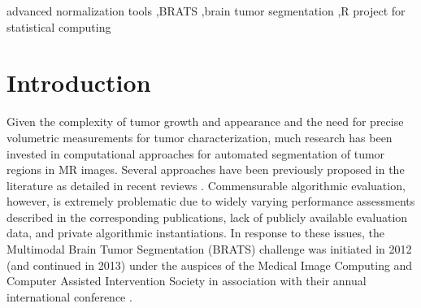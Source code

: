 \documentclass[preprint,authoryear,review,12pt]{elsarticle}
\begin{document}
\begin{frontmatter}
\begin{keyword}
advanced normalization tools \sep BRATS \sep brain tumor segmentation \sep R project for statistical computing
\end{keyword}

\end{frontmatter}

%
%
\newpage







%
%
%


%
%

\section{Introduction}
Given the complexity of tumor growth and appearance and the need
for precise volumetric measurements for tumor characterization, 
much research has been invested in computational approaches for 
automated segmentation of tumor regions in MR images.  Several 
approaches have been previously proposed in the literature as
detailed in recent reviews \citep{angelini2007,bauer2013}.  
Commensurable algorithmic evaluation, however, is
extremely problematic due to widely varying performance assessments
described in the corresponding publications, lack of publicly available 
evaluation data, and private algorithmic instantiations.  
In response to these issues, the Multimodal Brain Tumor Segmentation 
(BRATS) challenge was initiated in 2012 (and continued in 2013) under 
the auspices of the Medical Image Computing and Computer Assisted 
Intervention Society in association with their annual international 
conference \citep{menze2014}.
\end{document}
